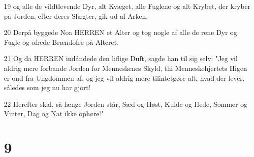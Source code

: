 \par 19 og alle de vildtlevende Dyr, alt Kvæget, alle Fuglene og alt Krybet, der kryber på Jorden, efter deres Slægter, gik ud af Arken.
\par 20 Derpå byggede Noa HERREN et Alter og tog nogle af alle de rene Dyr og Fugle og ofrede Brændofre på Alteret.
\par 21 Og da HERREN indåndede den liflige Duft, sagde han til sig selv: "Jeg vil aldrig mere forbande Jorden for Menneskenes Skyld, thi Menneskehjertets Higen er ond fra Ungdommen af, og jeg vil aldrig mere tilintetgøre alt, hvad der lever, således som jeg nu har gjort!
\par 22 Herefter skal, så længe Jorden står, Sæd og Høst, Kulde og Hede, Sommer og Vinter, Dag og Nat ikke ophøre!"

\chapter{9}

